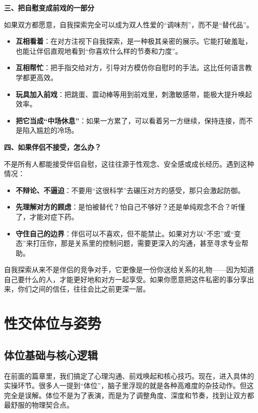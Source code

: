 \documentclass[12pt,UTF8]{ctexbook}
\begin{document}
\textbf{三、把自慰变成前戏的一部分}

如果双方都愿意，自我探索完全可以成为双人性爱的“调味剂”，而不是“替代品”。

\begin{itemize}
\item \textbf{互相看着}：在对方注视下自我探索，是一种极其亲密的展示。它能打破羞耻，也能让伴侣直观地看到“你喜欢什么样的节奏和力度”。
\item \textbf{互相帮忙}：把手指交给对方，引导对方模仿你自慰时的手法。这比任何语言教学都更高效。
\item \textbf{玩具加入前戏}：把跳蛋、震动棒等用到前戏里，刺激敏感带，能极大提升唤起效率。
\item \textbf{把它当成“中场休息”}：如果一方累了，可以看着另一方继续，保持连接，而不是陷入尴尬的冷场。
\end{itemize}

\textbf{四、如果伴侣不接受，怎么办？}

不是所有人都能接受伴侣自慰，这往往源于性观念、安全感或成长经历。遇到这种情况：

\begin{itemize}
\item \textbf{不辩论、不逼迫}：不要用“这很科学”去碾压对方的感受，那只会激起防御。
\item \textbf{先理解对方的顾虑}：是怕被替代？怕自己不够好？还是单纯观念不合？听懂了，才能对症下药。
\item \textbf{守住自己的边界}：伴侣可以不喜欢，但不能禁止。如果对方以“不忠”或“变态”来打压你，那是关系里的控制问题，需要更深入的沟通，甚至寻求专业帮助。
\end{itemize}

\begin{tcolorbox}[colback=pink!5!white,colframe=red!50!black,title=贴心小叮咛]
自我探索从来不是伴侣的竞争对手，它更像是一份你送给关系的礼物——因为知道自己要什么的人，才能更好地和对方一起享受。如果你愿意把这件私密的事分享出来，你们之间的信任，往往会比之前更深一层。
\end{tcolorbox}

\part{性交体位与姿势}

\chapter{体位基础与核心逻辑}

在前面的篇章里，我们搞定了心理沟通、前戏唤起和核心技巧。现在，进入具体的实操环节。很多人一提到“体位”，脑子里浮现的就是各种高难度的杂技动作。但这完全是误解。体位不是为了表演，而是为了调整角度、深度和节奏，找到让双方都最舒服的物理契合点。
\end{document}
